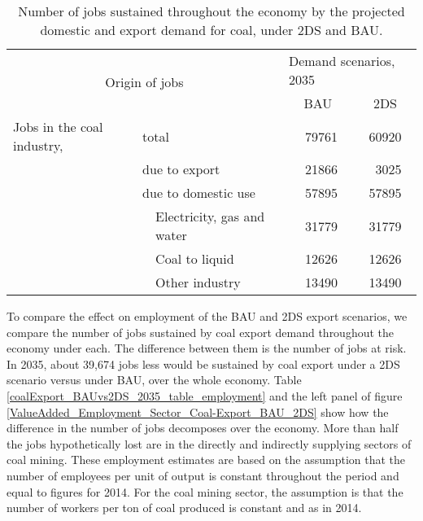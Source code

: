 \documentclass[12pt,english]{article}
\begin{document}
\begin{table}[!t]
	\centering
	\begin{tabular}{lp{20pt}lcc}
		\toprule
		\multicolumn{3}{c}{\multirow{2}{100pt}{Origin of jobs}} &\multicolumn{2}{l}{Demand scenarios, 2035}   \\ 
		\multicolumn{3}{c}{} & BAU & 2DS \\ 
		\midrule
		Jobs in the coal industry,	& \multicolumn{2}{l}{total}  &\ 79761  & 60920  \\ 
		\midrule
		& \multicolumn{2}{l}{due to export}  	   &\  21866 & \ 3025  \\ 
		& \multicolumn{2}{l}{due to domestic use}  &\  57895 & 57895 \\ 
		& 	 & Electricity, gas and water 		   &\  31779 & 31779  \\ 
		&    & Coal to liquid &\  12626  & 12626 \\ 
		&    & Other industry &\   13490 & 13490  \\ 														
		\bottomrule
	\end{tabular}
	\caption{\label{coalExport_BAUvs2DS_2035}Number of jobs sustained throughout the economy by the projected domestic and export demand for coal, under 2DS and BAU.}
\end{table}

To compare the effect on employment of the BAU and 2DS export scenarios, we compare the number of jobs sustained by coal export demand throughout the economy under each. The difference between them is the number of jobs at risk.
In 2035, about 39,674 jobs less would be sustained by coal export under a 2DS scenario versus under BAU, over the whole economy. Table \ref{coalExport_BAUvs2DS_2035_table_employment} and the left panel of figure \ref{ValueAdded_Employment_Sector_Coal-Export_BAU_2DS} show how the difference in the number of jobs decomposes over the economy. More than half the jobs hypothetically lost are in the directly and indirectly supplying sectors of coal mining. These employment estimates are based on the assumption that the number of employees per unit of output is constant throughout the period and equal to figures for 2014. For the coal mining sector, the assumption is that the number of workers per ton of coal produced is constant and as in 2014. 
\end{document}
